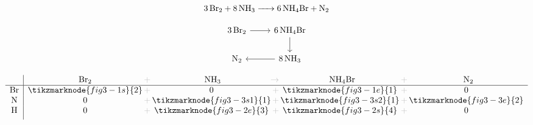 \documentclass{ctexart}
\newcommand{\grayplus}{\,\color{lightgray}+\,}
\newcommand{\grayto}{\,\color{lightgray}\to\,}
\newcommand{\arrowLR}[3]{%
    \draw[->|,red,thick]
    ([xshift=2pt]#1.south east)
    .. controls ++(0.3cm,-0.2cm) and ++(-0.3cm,-0.2cm) ..
    ([xshift=-2pt]#2.south west)
    node[midway,below,blue,font=\small] {#3};
}
\newcommand{\arrowRL}[3]{%
    \draw[->|,red,thick]
    ([xshift=-2pt]#1.south west)
    .. controls ++(-0.3cm,-0.2cm) and ++(0.3cm,-0.2cm) ..
    ([xshift=2pt]#2.south east)
    node[midway,below,blue,font=\small] {#3};
}
\newcommand{\arrowsToOneLR}[4]{%
    \draw[->,red,thick]
    ([xshift=2pt]#1.south east)
    .. controls ++(0.3cm,-0.2cm) and ++(-0.3cm,-0.2cm) ..
    ([xshift=-2pt]#3.south west)
    node[midway,below,blue,font=\small] {#4};
    \draw[->,red,thick]
    (#2.south)
    .. controls ++(0.3cm,-0.2cm) and ++(-0.3cm,-0.2cm) ..
    ([xshift=-2pt]#3.south west);
}
\begin{document}
\begin{center}
    \noindent
    \begin{minipage}[c]{0.4\textwidth}
        \[
            \ce{3 Br2 + 8 NH3 -> 6 NH4Br + N2}
        \]

        \[
            \begin{tikzcd}
                \ce{3Br2} \arrow[r] & \ce{6NH4Br} \arrow[d] \\
                \ce{N2} & \ce{8NH3} \arrow[l]
            \end{tikzcd}
        \]
    \end{minipage}%
    \hspace{0.01\textwidth}
    \begin{minipage}[c]{0.4\textwidth}
        \[
            \begin{array}{c|*{3}{c@{\grayplus}}c}
                & \multicolumn{1}{c@{\grayplus}}{\ce{Br2}} &
                \multicolumn{1}{c@{\grayto}}{\ce{NH3}} &
                \multicolumn{1}{c@{\grayplus}}{\ce{NH4Br}} &
                \multicolumn{1}{c}{\ce{N2}} \\
                \hline
                \ce{Br} & \tikzmarknode{fig3-1s}{2} & 0 &
                \tikzmarknode{fig3-1e}{1} & 0\\
                \ce{N} & 0 & \tikzmarknode{fig3-3s1}{1} &
                \tikzmarknode{fig3-3s2}{1} & \tikzmarknode{fig3-3e}{2}\\
                \ce{H} & 0 & \tikzmarknode{fig3-2e}{3}
                &\tikzmarknode{fig3-2s}{4} & 0\\[1ex]
            \end{array}
        \]
    \end{minipage}
\end{center}

\end{document}
